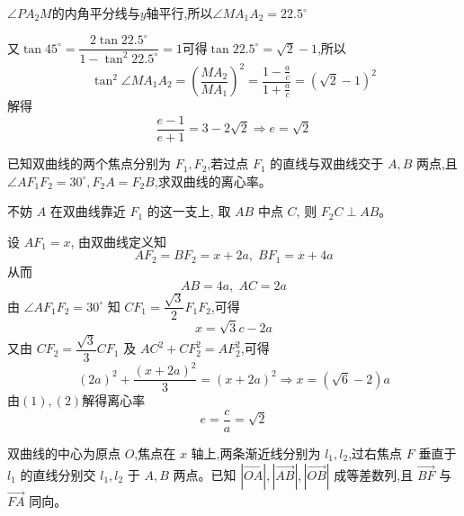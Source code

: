 \begin{questions}
\begin{solution}
        $\angle PA_{2}M$的内角平分线与$y$轴平行,所以$\angle MA_{1}A_{2}=22.5^{\circ}$
        
        又$\tan 45^{\circ}=\dfrac{2\tan 22.5^{\circ}}{1-\tan^{2}22.5^{\circ}}=1$可得$\tan 22.5^{\circ}=\sqrt{2}-1$,所以
        \[
        \tan^{2}\angle MA_{1}A_{2}=\left(\frac{MA_{2}}{MA_{1}}\right)^{2}=\frac{1-\frac{a}{c}}{1+\frac{a}{c}}=(\sqrt{2}-1)^{2}
        \]
        解得
        \[
        \frac{e-1}{e+1}=3-2\sqrt{2}\Rightarrow e=\sqrt{2}
        \]
    \end{solution}

    \question 已知双曲线的两个焦点分别为 $F_1, F_2$,若过点 $F_1$ 的直线与双曲线交于 $A, B$ 两点,且 $\angle AF_1F_2 = 30^\circ,F_2A = F_2B$,求双曲线的离心率。
    \begin{solution}
        不妨 $A$ 在双曲线靠近 $F_1$ 的这一支上, 取 $AB$ 中点 $C$, 则 $F_2C \perp AB$。
        
        设 $AF_1=x$, 由双曲线定义知
        \[
        AF_2 = BF_2= x+2a, \;BF_1=x+4a
        \]
        从而 
        \[
        AB=4a,\;AC=2a
        \]
        由 $\angle AF_1F_2=30^\circ$ 知 $CF_1=\dfrac{\sqrt{3}}{2}F_1F_2$,可得
        \[
        x=\sqrt{3}c-2a\tag{1}
        \]
        又由 $CF_2=\dfrac{\sqrt3}{3}CF_1$ 及 $AC^2+CF_2^2=AF_2^2$,可得 
        \[
        (2a)^2 + \frac{(x+2a)^2}{3}=(x+2a)^2 \Rightarrow x=(\sqrt{6}-2)a \tag{2}
        \]
        由$(1),(2)$解得离心率 
        \[
        e=\frac{c}{a}=\sqrt{2}
        \]
    \end{solution}

    \question 双曲线的中心为原点 $O$,焦点在 $x$ 轴上,两条渐近线分别为 $l_1, l_2$,过右焦点 $F$ 垂直于 $l_1$ 的直线分别交 $l_1, l_2$ 于 $A, B$ 两点。已知 $|\overrightarrow{OA}|, |\overrightarrow{AB}|, |\overrightarrow{OB}|$ 成等差数列,且 $\overrightarrow{BF}$ 与 $\overrightarrow{FA}$ 同向。
\end{questions}
